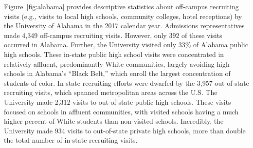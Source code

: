 \documentclass[twoside]{article}
\begin{document}
Figure~\ref{fig:alabama} provides descriptive statistics about off-campus recruiting visits (e.g., visits to local high schools, community colleges, hotel receptions) by the University of Alabama in the 2017 calendar year.  Admissions representatives made 4,349 off-campus recruiting visits.  However, only 392 of these visits occurred in Alabama.  Further, the University visited only 33\% of Alabama public high schools. These in-state public high school visits were concentrated in relatively affluent, predominantly White communities, largely avoiding high schools in Alabama's ``Black Belt,'' which enroll the largest concentration of students of color.  In-state recruiting efforts were dwarfed by the 3,957 out-of-state recruiting visits, which spanned metropolitan areas across the U.S. The University made 2,312 visits to out-of-state public high schools. These visits focused on schools in affluent communities, with visited schools having a much higher percent of White students than non-visited schools.  Incredibly, the University made 934 visits to out-of-state private high schools, more than double the total number of in-state recruiting visits.

\end{document}
